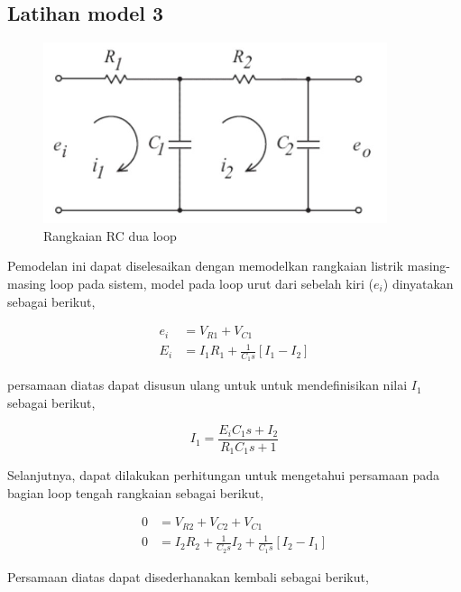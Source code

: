 \documentclass[12pt]{journal}
\begin{document}
\subsection{Latihan model 3}

\begin{figure}[H]
    \centering
    \includegraphics{model_nomor_3.png}
    \caption{Rangkaian RC dua loop}
    \label{soal_nomor_3}
\end{figure}

Pemodelan ini dapat diselesaikan dengan memodelkan rangkaian listrik masing-masing loop pada sistem, model pada loop urut dari sebelah kiri ($e_i$) dinyatakan sebagai berikut,

\begin{equation*}
    \begin{split}
        e_{i} &= V_{R1} + V_{C1} \\[5pt]
        E_{i} &= I_{1}R_{1} + \frac{1}{C_{1}s}[I_{1}-I_{2}]
    \end{split}
\end{equation*}

persamaan diatas dapat disusun ulang untuk untuk mendefinisikan nilai $ I_{1} $  sebagai berikut,

\begin{equation}
    I_1 = \frac{E_iC_1s+I_2}{R_1C_1s+1}
\end{equation}

Selanjutnya, dapat dilakukan perhitungan untuk mengetahui persamaan pada bagian loop tengah rangkaian sebagai berikut,

\begin{equation*}
    \begin{split}
        0 & = V_{R2} + V_{C2} + V_{C1} \\[5pt]
        0 & = I_2R_2 + \frac{1}{C_2s}I_2 + \frac{1}{C_1s}[I_2-I_1]
    \end{split}
\end{equation*}

Persamaan diatas dapat disederhanakan kembali sebagai berikut,
\end{document}

